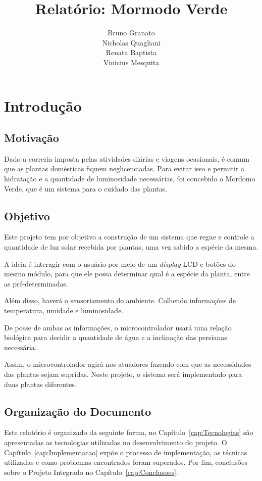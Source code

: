 \documentclass[a4paper,12pt]{report}
\title{ Relatório: Mormodo Verde \\}
\author{Bruno Granato \\
	Nicholas Quagliani\\
	Renata Baptista\\
	Vinicius Mesquita}
\begin{document}
\maketitle


\tableofcontents
\cleardoublepage
\chapter{Introdução}
	\section{Motivação}
		Dado a correria imposta pelas atividades diárias e viagens ocasionais, é comum que as plantas domésticas fiquem neglicenciadas. Para evitar isso e permitir a hidratação e a quantidade de luminosidade necessárias, foi concebido o Mordomo Verde, que é um sistema para o cuidado das plantas.
	\section{Objetivo}
		Este projeto tem por objetivo a construção de um sistema que regue e controle a quantidade de luz solar recebida por plantas, uma vez sabido a espécie da mesma.
		
		A ideia é interagir com o usuário por meio de um \textit{display} LCD e botões do mesmo módulo, para que ele possa determinar qual é a espécie da planta, entre as pré-determinadas. 
		
		Além disso, haverá o sensoriamento do ambiente. Colhendo informações de temperatura, umidade e luminosidade.
		
		De posse de ambas as informações, o microcontrolador usará uma relação biológica para decidir a quantidade de água e a inclinação das persianas necessária. 
		
		Assim, o microcontrolador agirá nos atuadores fazendo com que as necessidades das plantas sejam supridas. Neste projeto, o sistema será implementado para duas plantas diferentes.
	\section{Organização do Documento}
	    Este relatório é organizado da seguinte forma, no Capítulo~\ref{cap:Tecnologias} são apresentadas as tecnologias utilizadas no desenvolvimento do projeto. O Capítulo~\ref{cap:Implementacao} expõe o processo de implementação, as técnicas utilizadas e como problemas encontrados foram superados. Por fim, conclusões sobre o Projeto Integrado no Capítulo~\ref{cap:Conclusoes}.
\end{document}
